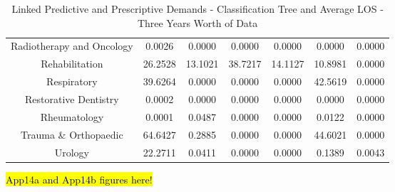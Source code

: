 \documentclass[thesis.tex]{subfiles}
\begin{document}
\begin{table}[h!]
{\begin{tabular}{ccccccc}
Radiotherapy and Oncology&	0.0026	&0.0000&	0.0000&	0.0000&	0.0000&	0.0000\\
Rehabilitation&	26.2528&	13.1021&	38.7217&	14.1127&	10.8981&	0.0000\\
Respiratory&	39.6264&	0.0000&	0.0000&	0.0000&	42.5619&	0.0000\\
Restorative Dentistry&	0.0002&	0.0000&	0.0000&	0.0000&	0.0000&	0.0000\\
Rheumatology&	0.0001&	0.0487&	0.0000&	0.0000&	0.0122&	0.0000\\
Trauma \& Orthopaedic&	64.6427	&0.2885&	0.0000&	0.0000&	44.6021&	0.0000\\
Urology&	22.2711&	0.0411&	0.0000&	0.0000&	0.1389&	0.0043\\\bottomrule


    \end{tabular}}
    \caption{Linked Predictive and Prescriptive Demands - Classification Tree and Average LOS - Three Years Worth of Data}
    \label{apptab:LinkedDemands6}
\end{table}

\hl{App14a and App14b figures here!}
\end{document}
